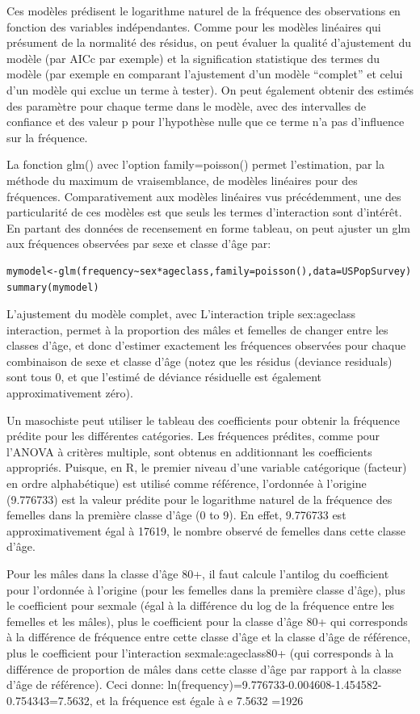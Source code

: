 \documentclass[12pt,]{book}
\begin{document}
Ces modèles prédisent le logarithme naturel de la fréquence des
observations en fonction des variables indépendantes. Comme pour
les modèles linéaires qui présument de la normalité des résidus, on
peut évaluer la qualité d'ajustement du modèle (par AICc par exemple)
et la signification statistique des termes du modèle (par exemple en
comparant l'ajustement d'un modèle ``complet'' et celui d'un modèle
qui exclue un terme à tester). On peut également obtenir des estimés
des paramètre pour chaque terme dans le modèle, avec des intervalles
de confiance et des valeur p pour l'hypothèse nulle que ce terme n'a
pas d'influence sur la fréquence.

La fonction glm() avec l'option family=poisson() permet l'estimation,
par la méthode du maximum de vraisemblance, de modèles linéaires
pour des fréquences.
Comparativement aux modèles linéaires vus précédemment, une des
particularité de ces modèles est que seuls les termes d'interaction
sont d'intérêt.
En partant des données de recensement en forme tableau, on peut
ajuster un glm aux fréquences observées par sexe et classe d'âge par:

\begin{verbatim}
mymodel<-glm(frequency~sex*ageclass,family=poisson(),data=USPopSurvey)
summary(mymodel)
\end{verbatim}

L'ajustement du modèle complet, avec L'interaction triple sex:ageclass
interaction, permet à la proportion des mâles et femelles de changer
entre les classes d'âge, et donc d'estimer exactement les fréquences
observées pour chaque combinaison de sexe et classe d'âge (notez que
les résidus (deviance residuals) sont tous 0, et que l'estimé de déviance
résiduelle est également approximativement zéro).

Un masochiste peut utiliser le tableau des coefficients pour obtenir la
fréquence prédite pour les différentes catégories. Les fréquences
prédites, comme pour l'ANOVA à critères multiple, sont obtenus en
additionnant les coefficients appropriés. Puisque, en R, le premier
niveau d'une variable catégorique (facteur) en ordre alphabétique) est
utilisé comme référence, l'ordonnée à l'origine (9.776733) est la valeur
prédite pour le logarithme naturel de la fréquence des femelles dans la
première classe d'âge (0 to 9). En effet, 9.776733 est approximativement
égal à 17619, le nombre observé de femelles dans cette classe d'âge.

Pour les mâles dans la classe d'âge 80+, il faut calcule l'antilog du
coefficient pour l'ordonnée à l'origine (pour les femelles dans la
première classe d'âge), plus le coefficient pour sexmale (égal à la
différence du log de la fréquence entre les femelles et les mâles), plus
le coefficient pour la classe d'âge 80+ qui corresponds à la différence
de fréquence entre cette classe d'âge et la classe d'âge de référence,
plus le coefficient pour l'interaction sexmale:ageclass80+ (qui
corresponds à la différence de proportion de mâles dans cette classe
d'âge par rapport à la classe d'âge de référence). Ceci donne:
ln(frequency)=9.776733-0.004608-1.454582-0.754343=7.5632, et la
fréquence est égale à e 7.5632 =1926
\end{document}
